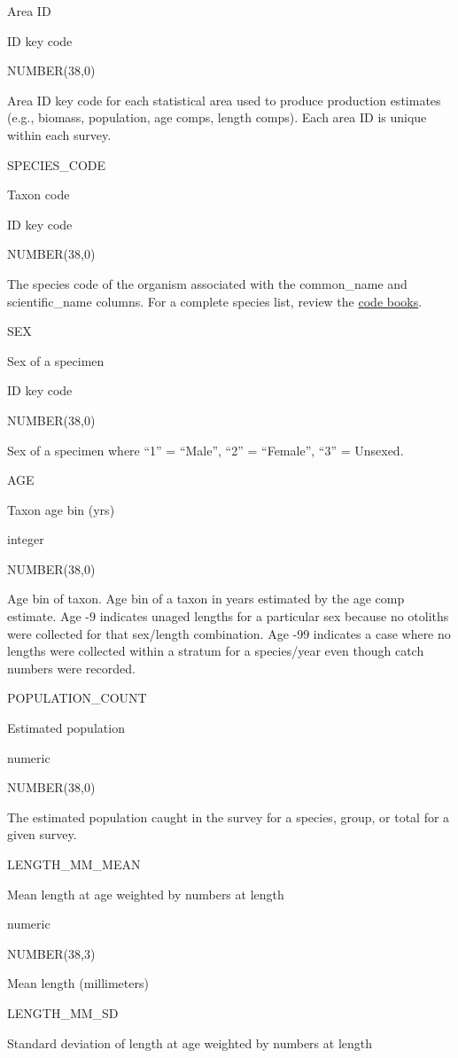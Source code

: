 \documentclass[
  letterpaper,
  oneside,
  open=any]{scrbook}
\begin{document}
Area ID

ID key code

NUMBER(38,0)

Area ID key code for each statistical area used to produce production
estimates (e.g., biomass, population, age comps, length comps). Each
area ID is unique within each survey.

SPECIES\_CODE

Taxon code

ID key code

NUMBER(38,0)

The species code of the organism associated with the common\_name and
scientific\_name columns. For a complete species list, review the
\href{https://www.fisheries.noaa.gov/resource/document/groundfish-survey-species-code-manual-and-data-codes-manual}{code
books}.

SEX

Sex of a specimen

ID key code

NUMBER(38,0)

Sex of a specimen where ``1'' = ``Male'', ``2'' = ``Female'', ``3'' =
Unsexed.

AGE

Taxon age bin (yrs)

integer

NUMBER(38,0)

Age bin of taxon. Age bin of a taxon in years estimated by the age comp
estimate. Age -9 indicates unaged lengths for a particular sex because
no otoliths were collected for that sex/length combination. Age -99
indicates a case where no lengths were collected within a stratum for a
species/year even though catch numbers were recorded.

POPULATION\_COUNT

Estimated population

numeric

NUMBER(38,0)

The estimated population caught in the survey for a species, group, or
total for a given survey.

LENGTH\_MM\_MEAN

Mean length at age weighted by numbers at length

numeric

NUMBER(38,3)

Mean length (millimeters)

LENGTH\_MM\_SD

Standard deviation of length at age weighted by numbers at length
\end{document}
